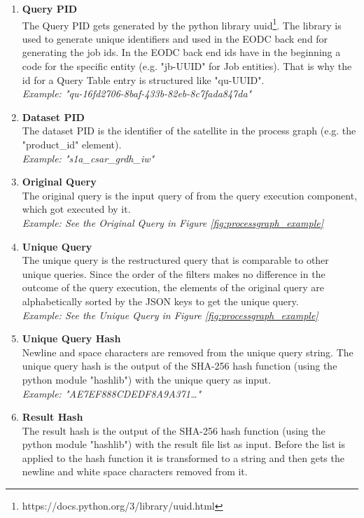 \documentclass[draft,final]{vutinfth} %
\begin{document}
\begin{enumerate}
	\item \textbf{Query PID} \\
	The Query PID gets generated by the python library uuid\footnote{https://docs.python.org/3/library/uuid.html}. The library is used to generate unique identifiers and used in the EODC back end for generating the job ids. In the EODC back end ids have in the beginning a code for the specific entity (e.g. "jb-UUID" for Job entities). That is why the id for a Query Table entry is structured like "qu-UUID". \\
	\textit{Example: "qu-16fd2706-8baf-433b-82eb-8c7fada847da"}
	\item \textbf{Dataset PID} \\
	The dataset PID is the identifier of the satellite in the process graph (e.g. the "product\_id" element). \\
	\textit{Example: "s1a\_csar\_grdh\_iw"}	    	
	\item\textbf{Original Query} \\
	The original query is the input query of from the query execution component, which got executed by it.  \\ 
	\textit{Example: See the Original Query in Figure \ref{fig:processgraph_example}}	 
	\item \textbf{Unique Query} \\
	The unique query is the restructured query that is comparable to other unique queries. Since the order of the filters makes no difference in the outcome of the query execution, the elements of the original query are alphabetically sorted by the JSON keys to get the unique query. \\
	\textit{Example: See the Unique Query in Figure \ref{fig:processgraph_example}}	  	 	
	\item \textbf{Unique Query Hash} \\ 
	Newline and space characters are removed from the unique query string. The unique query hash is the output of the SHA-256 hash function (using the python module "hashlib") with the unique query as input.  \\
	\textit{Example: "AE7EF888CDEDF8A9A371\dots"} 
	\item \textbf{Result Hash} \\
	The result hash is the output of the SHA-256 hash function (using the python module "hashlib") with the result file list as input. Before the list is applied to the hash function it is transformed to a string and then gets the newline and white space characters removed from it. \\

\end{enumerate}
\end{document}
